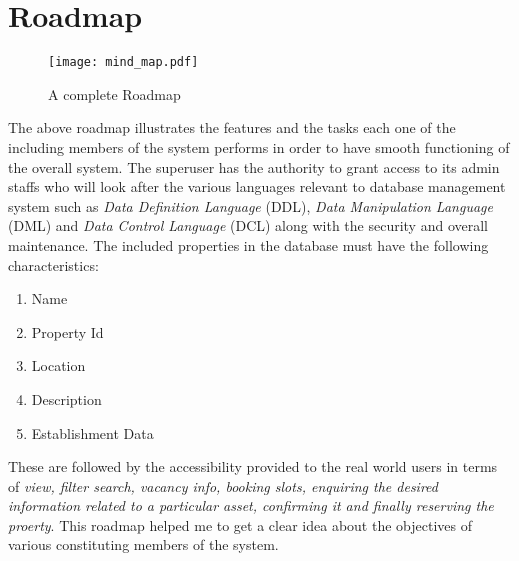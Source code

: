 \documentclass[12pt]{report}
\begin{document}
\section{Roadmap} 

\begin{figure}[!htb]
\texttt{[image: mind\_map.pdf]}
\centering
\caption{A complete Roadmap}

\end{figure}

The above roadmap illustrates the features and the tasks each one of the including members of the system performs in order to have smooth functioning of the overall system. The superuser has the authority to grant access to its admin staffs who will look after the various languages relevant to database management system such as \textit{Data Definition Language} (DDL),  \textit{Data Manipulation Language} (DML) and  \textit{Data Control Language} (DCL) along with the security and overall maintenance. The included properties in the database must have the following characteristics:
\begin{enumerate}
\item Name
\item Property Id 
\item Location
\item Description
\item Establishment Data
\end{enumerate} 
These are followed by the accessibility provided to the real world users in terms of \textit{view, filter search, vacancy info, booking slots, enquiring the desired information related to a particular asset, confirming it and finally reserving the proerty}. This roadmap helped me to get a clear idea about the objectives of various constituting members of the system. 
\end{document}
